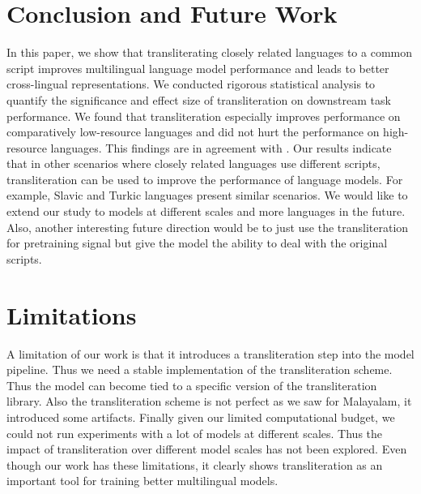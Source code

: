 \documentclass[11pt]{article}
\begin{document}
\section{Conclusion and Future Work}
In this paper, we show that transliterating closely related languages to a common script improves multilingual language model performance and leads to better cross-lingual representations. We conducted rigorous statistical analysis to quantify the significance and effect size of transliteration on downstream task performance. We found that transliteration especially improves performance on comparatively low-resource languages and did not hurt the performance on high-resource languages. This findings are in agreement with \citep{dhamecha-etal-2021-role,muller-etal-2021-unseen}. 
Our results indicate that in other scenarios where closely related languages use different scripts, transliteration can be used to improve the performance of language models. For example, Slavic and Turkic languages present similar scenarios. 
We would like to extend our study to models at different scales and more languages in the future. Also, another interesting future direction would be to just use the transliteration for pretraining signal but give the model the ability to deal with the original scripts. \section*{Limitations}
A limitation of our work is that it introduces a transliteration step into the model pipeline. Thus we need a stable implementation of the transliteration scheme. Thus the model can become tied to a specific version of the transliteration library. Also the transliteration scheme is not perfect as we saw for Malayalam, it introduced some artifacts. Finally given our limited computational budget, we could not run experiments with a lot of models at different scales. Thus the impact of transliteration over different model scales has not been explored. Even though our work has these limitations, it clearly shows transliteration as an important tool for training better multilingual models.
\end{document}
